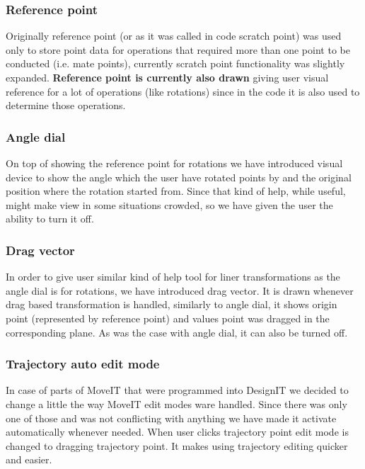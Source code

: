 \documentclass[a4paper, 11pt, article]{report}
\begin{document}
\subsubsection{Reference point}

Originally reference point (or as it was called in code scratch point) was used only to store point data for operations that required more than one point to be conducted (i.e. mate points), currently scratch point functionality was slightly expanded. \textbf{Reference point is currently also drawn} giving user visual reference for a lot of operations (like rotations) since in the code it is also used to determine those operations.

\subsubsection{Angle dial}

On top of showing the reference point for rotations we have introduced visual device to show the angle which the user have rotated points by and the original position where the rotation started from. Since that kind of help, while useful, might make view in some situations crowded, so we have given the user the ability to turn it off.

\subsubsection{Drag vector}

In order to give user similar kind of help tool for liner transformations as the angle dial is for rotations, we have introduced drag vector. It is drawn whenever drag based transformation is handled, similarly to angle dial, it shows origin point (represented by reference point) and values point was dragged in the corresponding plane. As was the case with angle dial, it can also be turned off.

\subsubsection{Trajectory auto edit mode}

In case of parts of MoveIT that were programmed into DesignIT we decided to change a little the way MoveIT edit modes ware handled. Since there was only one of those and was not conflicting with anything we have made it activate automatically whenever needed. When user clicks trajectory point edit mode is changed to dragging trajectory point. It makes using trajectory editing quicker and easier.
\end{document}

